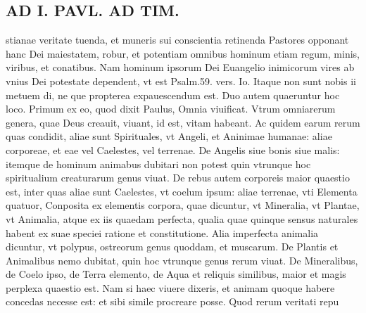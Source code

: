 \documentclass{article}
\begin{document}
\begin{pages}
\section*{AD I. PAVL. AD TIM. }
\marginpar{[ p.470 ]}\pstart stianae veritate tuenda, et muneris sui conscientia retinenda Pastores opponant hanc Dei maiestatem, robur, et potentiam omnibus hominum etiam regum, minis, viribus, et conatibus. Nam hominum ipsorum Dei Euangelio inimicorum vires ab vnius Dei potestate dependent, vt est Psalm.59. vers. Io. Itaque non sunt nobis ii metuem di, ne que propterea expauescendum est.  \pend\pstart Duo autem quaeruntur hoc loco. Primum ex eo, quod dixit Paulus, Omnia viuificat. Vtrum omniarerum genera, quae Deus creauit, viuant, id est, vitam habeant. Ac quidem earum rerum quas condidit, aliae sunt Spirituales, vt Angeli, et Aninimae humanae: aliae corporeae, et eae vel Caelestes, vel terrenae. De Angelis siue bonis siue malis: itemque de hominum animabus dubitari non potest quin vtrunque  hoc spiritualium creaturarum genus viuat. De rebus autem corporeis maior quaestio est, inter quas aliae sunt Caelestes, vt coelum ipsum: aliae terrenae, vti Elementa quatuor, Conposita ex elementis corpora, quae dicuntur, vt Mineralia, vt Plantae, vt Animalia, atque  ex iis quaedam perfecta, qualia quae quinque sensus naturales habent ex suae speciei ratione et constitutione. Alia imperfecta animalia dicuntur, vt polypus, ostreorum genus quoddam, et muscarum. De Plantis et Animalibus nemo dubitat, quin hoc vtrunque genus rerum viuat. De Mineralibus, de Coelo ipso, de Terra elemento, de Aqua et reliquis similibus, maior et magis perplexa quaestio est. Nam si haec viuere dixeris, et animam quoque habere concedas necesse est: et sibi simile procreare posse. Quod rerum veritati repu\pend

\end{pages}
\end{document}
